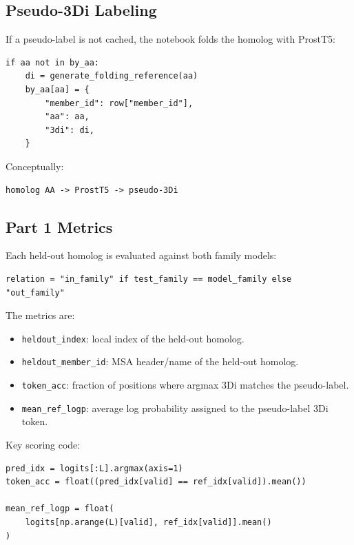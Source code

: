 \documentclass[11pt,a4paper]{article}
\begin{document}
\subsection{Pseudo-3Di Labeling}

If a pseudo-label is not cached, the notebook folds the homolog with ProstT5:

\begin{verbatim}
if aa not in by_aa:
    di = generate_folding_reference(aa)
    by_aa[aa] = {
        "member_id": row["member_id"],
        "aa": aa,
        "3di": di,
    }
\end{verbatim}

Conceptually:

\begin{verbatim}
homolog AA -> ProstT5 -> pseudo-3Di
\end{verbatim}

\subsection{Part 1 Metrics}

Each held-out homolog is evaluated against both family models:

\begin{verbatim}
relation = "in_family" if test_family == model_family else "out_family"
\end{verbatim}

The metrics are:

\begin{itemize}
  \item \texttt{heldout\_index}: local index of the held-out homolog.
  \item \texttt{heldout\_member\_id}: MSA header/name of the held-out homolog.
  \item \texttt{token\_acc}: fraction of positions where argmax 3Di matches the pseudo-label.
  \item \texttt{mean\_ref\_logp}: average log probability assigned to the pseudo-label 3Di token.
\end{itemize}

Key scoring code:

\begin{verbatim}
pred_idx = logits[:L].argmax(axis=1)
token_acc = float((pred_idx[valid] == ref_idx[valid]).mean())

mean_ref_logp = float(
    logits[np.arange(L)[valid], ref_idx[valid]].mean()
)
\end{verbatim}
\end{document}
